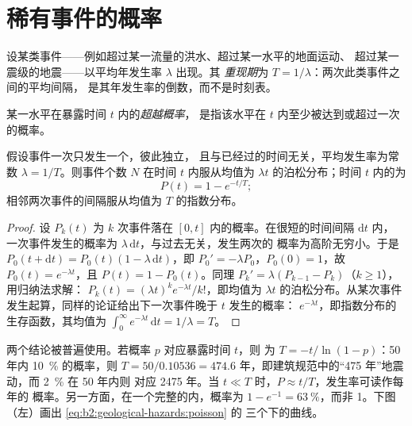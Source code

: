 \section{稀有事件的概率}\label{sec:b2:geological-hazards:probability}

\begin{definition}[重现期]\label{def:b2:geological-hazards:return}
设某类事件——例如超过某一流量的洪水、超过某一水平的地面运动、
超过某一震级的地震——以平均年发生率 $\lambda$ 出现。其
\emph{重现期}为 $T = 1/\lambda$：两次此类事件之间的平均间隔，
是其年发生率的倒数，而不是时刻表。
\end{definition}

\begin{definition}[超越概率]\label{def:b2:geological-hazards:poisson}
某一水平在暴露时间 $t$ 内的\emph{超越概率}，
是指该水平在 $t$ 内至少被达到或超过一次的概率。
\end{definition}

\begin{proposition}[泊松复发模型]\label{prop:b2:geological-hazards:poisson}
假设事件一次只发生一个，彼此独立，
且与已经过的时间无关，平均发生率为常数 $\lambda = 1/T$。则事件个数 $N$
在时间 $t$ 内服从均值为 $\lambda t$ 的泊松分布；时间
$t$ 内的为
\begin{equation}
P(t) = 1 - e^{-t/T};
\label{eq:b2:geological-hazards:poisson}
\end{equation}
相邻两次事件的间隔服从均值为 $T$ 的指数分布。
\end{proposition}

\begin{proof}
设 $P_k(t)$ 为 $k$ 次事件落在 $[0, t]$ 内的概率。在很短的时间间隔 $\mathrm{d}t$ 内，
一次事件发生的概率为 $\lambda\,\mathrm{d}t$，与过去无关，发生两次的
概率为高阶无穷小。于是 $P_0(t + \mathrm{d}t) = P_0(t)(1 - \lambda\,\mathrm{d}t)$，即
$P_0' = -\lambda P_0$，$P_0(0) = 1$，故 $P_0(t) = e^{-\lambda t}$，且 $P(t) = 1 - P_0(t)$。同理
$P_k' = \lambda(P_{k-1} - P_k)$（$k \geq 1$），用归纳法求解：
$P_k(t) = (\lambda t)^k e^{-\lambda t}/k!$，即均值为 $\lambda t$ 的泊松分布。从某次事件
发生起算，同样的论证给出下一次事件晚于 $t$ 发生的概率：
$e^{-\lambda t}$，即指数分布的生存函数，其均值为
$\int_0^\infty e^{-\lambda t}\,\mathrm{d}t = 1/\lambda = T$。
\end{proof}

两个结论被普遍使用。若概率 $p$ 对应暴露时间 $t$，则
为 $T = -t/\ln(1 - p)$：50 年内 \qty{10}{\percent} 的概率，则 $T = 50/0.10536 =
474.6$ 年，即建筑规范中的“475 年”地震动，而 \qty{2}{\percent} 在 50 年内则
对应 2475 年。当 $t \ll T$ 时，$P \approx t/T$，发生率可读作每年的
概率。另一方面，在一个完整的内，概率为 $1 - e^{-1} =
\qty{63}{\percent}$，而非 1。下图（左）画出 \eqref{eq:b2:geological-hazards:poisson} 的
三个下的曲线。

